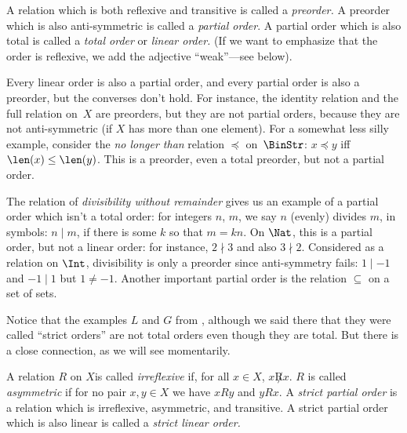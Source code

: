 \documentclass[../../include/open-logic-section]{subfiles}
\begin{document}

\begin{defn}
A relation which is both reflexive and transitive is called a
\emph{preorder.}  A preorder which is also anti-symmetric is called a
\emph{partial order}. A partial order which is also total is called a
\emph{total order} or \emph{linear order.} (If we want to emphasize
that the order is reflexive, we add the adjective ``weak''---see
below).
\end{defn}

\begin{ex}
Every linear order is also a partial order, and every partial order is
also a preorder, but the converses don't hold. For instance, the
identity relation and the full relation on~$X$ are preorders, but they
are not partial orders, because they are not anti-symmetric (if $X$
has more than one element). For a somewhat less silly example,
consider the \emph{no longer than} relation $\preccurlyeq$
on~$\BinStr$: $x\preccurlyeq y$ iff $\len(x)\le\len(y)$. This is a
preorder, even a total preorder, but not a partial order.

The relation of \emph{divisibility without remainder} gives us an
example of a partial order which isn't a total order: for integers
$n$, $m$, we say $n$ (evenly) divides $m$, in symbols: $n\mid m$, if
there is some $k$ so that $m=kn$.  On $\Nat$, this is a partial order,
but not a linear order: for instance, $2\nmid3$ and also
$3\nmid2$. Considered as a relation on $\Int$, divisibility is only a
preorder since anti-symmetry fails: $1\mid-1$ and $-1\mid1$ but
$1\neq-1$. Another important partial order is the relation $\subseteq$
on a set of sets.

Notice that the examples $L$ and $G$ from ,
although we said there that they were called ``strict orders'' are not
total orders even though they are total. But there is a close
connection, as we will see momentarily.
\end{ex}

\begin{defn}
A relation $R$ on $X$is called \emph{irreflexive} if, for all $x\in
X$, $x\not Rx$. $R$ is called \emph{asymmetric} if for no pair $x,y\in
X$ we have $xRy$ and $yRx$. A \emph{strict partial order} is a
relation which is irreflexive, asymmetric, and transitive. A strict
partial order which is also linear is called a \emph{strict linear
  order.}
\end{defn}
\end{document}
